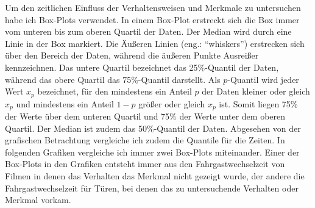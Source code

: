 Um den zeitlichen Einfluss der Verhaltensweisen und Merkmale zu untersuchen habe ich Box-Plots verwendet. In einem Box-Plot erstreckt sich die Box immer vom unteren bis zum oberen Quartil der Daten. Der Median wird durch eine Linie in der Box markiert. Die Äußeren Linien (eng.: "`whiskers"') erstrecken sich über den Bereich der Daten, während die äußeren Punkte Ausreißer kennzeichnen. Das untere Quartil bezeichnet das 25\%-Quantil der Daten, während das obere Quartil das 75\%-Quantil darstellt. Als $p$-Quantil wird jeder Wert $x_p$ bezeichnet, für den mindestens ein Anteil $p$ der Daten kleiner oder gleich $x_p$ und mindestens ein Anteil $1-p$ größer oder gleich $x_p$ ist. Somit liegen 75\% der Werte über dem unteren Quartil und 75\% der Werte unter dem oberen Quartil. Der Median ist zudem das 50\%-Quantil der Daten. Abgesehen von der grafischen Betrachtung vergleiche ich zudem die Quantile für die Zeiten. In folgenden Grafiken vergleiche ich immer zwei Box-Plots miteinander. Einer der Box-Plots in den Grafiken entsteht immer aus den Fahrgastwechselzeit von Filmen in denen das Verhalten \bzw das Merkmal nicht gezeigt wurde, der andere die Fahrgastwechselzeit für Türen, bei denen das zu untersuchende Verhalten oder Merkmal vorkam.

